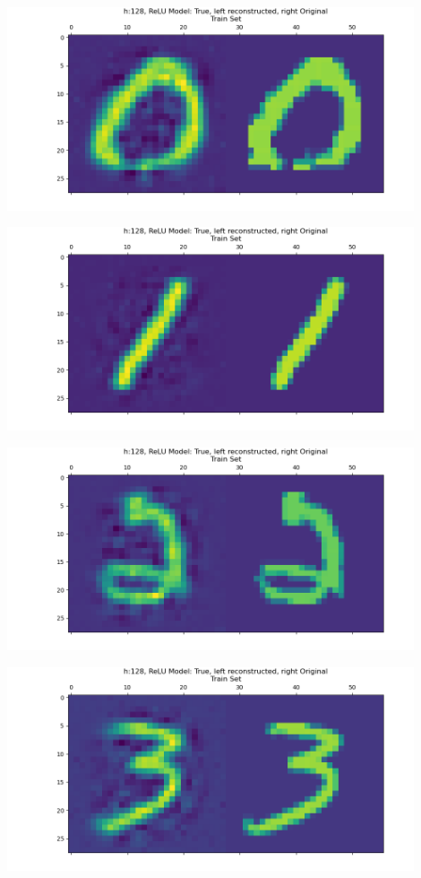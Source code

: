 \documentclass[]{article}
\begin{document}
            \begin{center}
                \includegraphics*[width=12cm]{A4plots/06-57-22-h-128-nonlin-digit-0.png}
            \end{center}
            \begin{center}
                \includegraphics*[width=12cm]{A4plots/06-57-22-h-128-nonlin-digit-1.png}
            \end{center}
            \begin{center}
                \includegraphics*[width=12cm]{A4plots/06-57-22-h-128-nonlin-digit-2.png}
            \end{center}
            \begin{center}
                \includegraphics*[width=12cm]{A4plots/06-57-22-h-128-nonlin-digit-3.png}
            \end{center}
\end{document}
